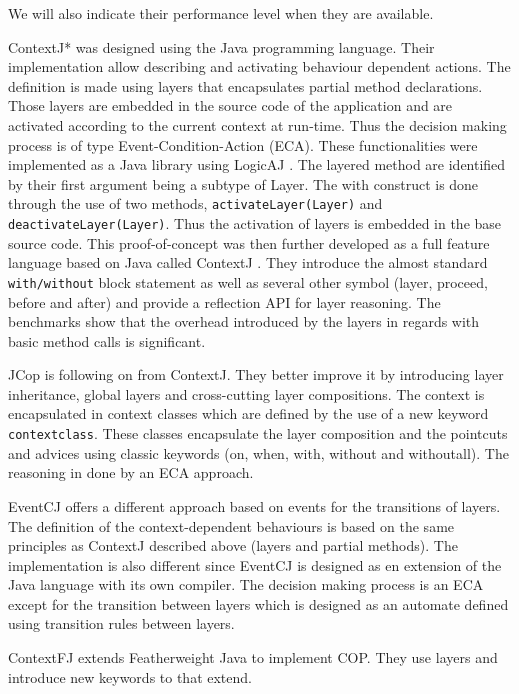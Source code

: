 \documentclass[a4paper]{article}
\begin{document}
We will also indicate their performance level when they are available.

ContextJ* \cite{appeltauer_dedicated_2008} was designed using the Java programming language. Their implementation allow describing and activating behaviour dependent actions. The definition is made using layers that encapsulates partial method declarations. Those layers are embedded in the source code of the application and are activated according to the current context at run-time. Thus the decision making process is of type Event-Condition-Action (ECA). These functionalities were implemented as a Java library using LogicAJ \cite{}. The layered method are identified by their first argument being a subtype of Layer. The  with construct is done through the use of two methods, \lstinline|activateLayer(Layer)| and \lstinline|deactivateLayer(Layer)|. Thus the activation of layers is embedded in the base source code. This proof-of-concept was then further developed as a full feature language based on Java called ContextJ \cite{haupt_contextj:_2011} \cite{appeltauer_improving_2009}. They introduce  the almost standard \lstinline|with/without| block statement as well as several other symbol (layer, proceed, before and after) and provide a reflection API for layer reasoning. The benchmarks show that the overhead introduced by the layers in regards with basic method calls is significant.

JCop \cite{appeltauer_declarative_2013} is following on from ContextJ. They better improve it by introducing layer inheritance, global layers and cross-cutting layer compositions. The context is encapsulated in context classes which are defined by the use of a new keyword \lstinline|contextclass|. These classes encapsulate the layer composition and the pointcuts and advices using classic keywords (on, when, with, without and withoutall). The reasoning in done by an ECA approach.

EventCJ \cite{kamina_eventcj:_2011} offers a different approach based on events for the transitions of layers. The definition of the context-dependent behaviours is based on the same principles as ContextJ described above (layers and partial methods). The implementation is also different since EventCJ is designed as en extension of the Java language with its own compiler. The decision making process is an ECA except for the transition between layers which is designed as an automate defined using transition rules between layers.

ContextFJ \cite{clarke_semantics_2009} extends Featherweight Java \cite{} to implement COP. They use layers and introduce new keywords to that extend.
\end{document}
